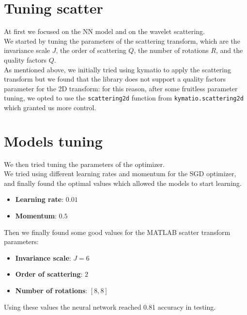 \documentclass{report}
\begin{document}
\section{Tuning scatter}
At first we focused on the NN model and on the wavelet scattering. \\
We started by tuning the parameters of the scattering transform, which are the invariance scale $J$, the order of scattering $Q$, the number of rotations $R$, and the quality factors $Q$. \\

As mentioned above, we initially tried using kymatio to apply the scattering transform but we found that the library does not support a quality factors parameter for the 2D transform: for this reason, after some fruitless parameter tuning, 
we opted to use the \texttt{scattering2d} function from \texttt{kymatio.scattering2d} which granted us more control. \\

\section{Models tuning}
We then tried tuning the parameters of the optimizer.\\
We tried using different learning rates and momentum for the SGD optimizer, and finally found the optimal values which allowed the models to start learning.
\begin{itemize}
  \item \textbf{Learning rate}: $0.01$ 
  \item \textbf{Momentum}: $0.5$
\end{itemize}

Then we finally found some good values for the MATLAB scatter transform parameters:
\begin{itemize}
  \item \textbf{Invariance scale}: $J=6$
  \item \textbf{Order of scattering}: $2$
  \item \textbf{Number of rotations}: $[8, 8]$
\end{itemize}
Using these values the neural network reached 0.81 accuracy in testing.\\
\end{document}
